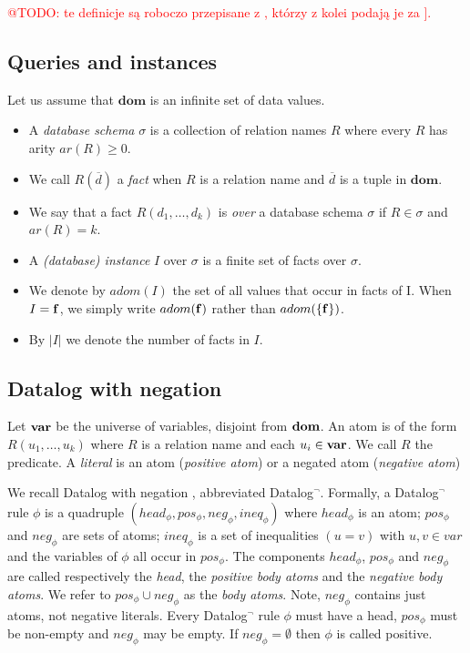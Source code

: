\documentclass{pracamgr}
\makeatletter
\theoremstyle{plain}
\theoremstyle{definition}
\theoremstyle{remark}
\newcommand{\todo}[1]{\textcolor{red}{@TODO: #1}}
\makeatother
\begin{document}
\todo{te definicje są roboczo przepisane z \cite{wfom}, którzy z kolei podają je za \cite{fod}].}

\subsection{Queries and instances}

Let us assume that $\bm{dom}$ is an infinite set of
data values.
\begin{itemize}
\item A \emph{database schema} $\sigma$ is a collection of relation names $R$ where every $R$ has arity $ar(R) \ge 0$.
\item We call $R(\overline{d})$ a \emph{fact} when $R$ is a relation name and $\overline{d}$ is a tuple in $\bm{dom}$.
\item We say that a fact $R(d_1 , \dots , d_k)$ is \emph{over} a database schema $\sigma$ if $R \in \sigma$ and $ar (R) = k$.
\item  A \emph{(database) instance} $I$ over $\sigma$ is a finite set of facts over $\sigma$.
\item  We denote by $adom(I)$ the set of all values that occur in facts of I. When $I = {\bf{f}}$, we simply write $adom(\bf{f})$ rather than $adom(\{\bf{f}\})$.
\item By $|I|$ we denote the
number of facts in $I$.
\end{itemize}



\subsection{Datalog with negation}
Let $\bf{var}$ be the universe of variables, disjoint from $\bf{dom}$. An atom is of the form $R(u_1 , \dots, u_k)$ where $R$ is a relation name and each $u_i \in \bf{var}$. We call $R$ the predicate. A \emph{literal} is an atom (\emph{positive atom}) or a negated atom (\emph{negative atom})


We recall Datalog with negation \cite{fod}, abbreviated Datalog$^\neg$.
Formally, a Datalog$^\neg$ rule $\phi$ is a quadruple $(head_\phi, pos_\phi,
neg_\phi , ineq_\phi)$ where $head_\phi$ is an atom; $pos_\phi$ and $neg_\phi$ are
sets of atoms; $ineq_\phi$ is a set of inequalities $(u = v)$ with
$u, v \in var$ and the variables of $\phi$ all occur in $pos_\phi$. The
components $head_\phi$, $pos_\phi$ and $neg_\phi$ are called respectively the
\emph{head}, the \emph{positive body atoms} and the \emph{negative body atoms}.
We refer to $pos_\phi \cup neg_\phi$ as the \emph{body atoms}. Note, $neg_\phi$
contains just atoms, not negative literals. Every Datalog$^\neg$
rule $\phi$ must have a head, $pos_\phi$ must be non-empty and $neg_\phi$
may be empty. If $neg_\phi = \emptyset$ then $\phi$ is called positive.
\end{document}
